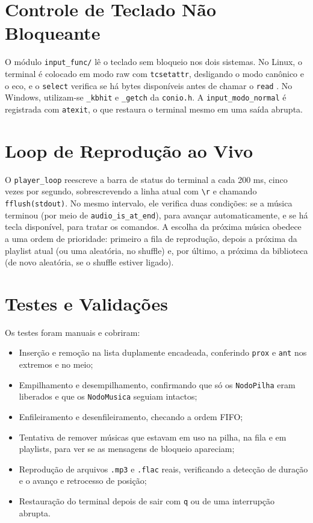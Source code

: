 \documentclass[
    12pt
    ,oneside
    ,a4paper
    ,chapter=TITLE
    ,section=TITLE
    ,sumario=abnt-6027-2012]{abntex2}
\begin{document}
\section{Controle de Teclado Não Bloqueante}

O módulo \texttt{input\_func/} lê o teclado sem bloqueio nos dois sistemas. No Linux, o terminal é colocado em modo raw com \texttt{tcsetattr}, desligando o modo canônico e o eco, e o \texttt{select} verifica se há bytes disponíveis antes de chamar o \texttt{read} \cite{manpages_linux}. No Windows, utilizam-se \texttt{\_kbhit} e \texttt{\_getch} da \texttt{conio.h}. A \texttt{input\_modo\_normal} é registrada com \texttt{atexit}, o que restaura o terminal mesmo em uma saída abrupta.

\section{Loop de Reprodução ao Vivo}

O \texttt{player\_loop} reescreve a barra de status do terminal a cada 200 ms, cinco vezes por segundo, sobrescrevendo a linha atual com \texttt{\textbackslash r} e chamando \texttt{fflush(stdout)}. No mesmo intervalo, ele verifica duas condições: se a música terminou (por meio de \texttt{audio\_is\_at\_end}), para avançar automaticamente, e se há tecla disponível, para tratar os comandos. A escolha da próxima música obedece a uma ordem de prioridade: primeiro a fila de reprodução, depois a próxima da playlist atual (ou uma aleatória, no shuffle) e, por último, a próxima da biblioteca (de novo aleatória, se o shuffle estiver ligado).

\section{Testes e Validações}

Os testes foram manuais e cobriram:

\begin{itemize}
    \item Inserção e remoção na lista duplamente encadeada, conferindo \texttt{prox} e \texttt{ant} nos extremos e no meio;
    \item Empilhamento e desempilhamento, confirmando que só os \texttt{NodoPilha} eram liberados e que os \texttt{NodoMusica} seguiam intactos;
    \item Enfileiramento e desenfileiramento, checando a ordem FIFO;
    \item Tentativa de remover músicas que estavam em uso na pilha, na fila e em playlists, para ver se as mensagens de bloqueio apareciam;
    \item Reprodução de arquivos \texttt{.mp3} e \texttt{.flac} reais, verificando a detecção de duração e o avanço e retrocesso de posição;
    \item Restauração do terminal depois de sair com \texttt{q} ou de uma interrupção abrupta.
\end{itemize}
\end{document}
